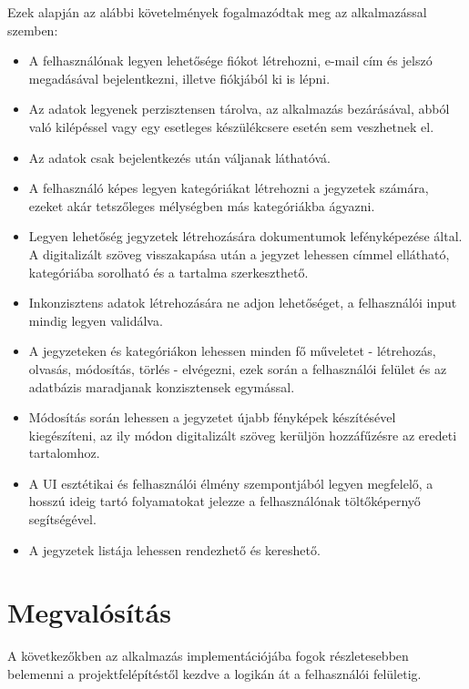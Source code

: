 Ezek alapján az alábbi követelmények fogalmazódtak meg az alkalmazással szemben:
\begin{itemize}
	\item A felhasználónak legyen lehetősége fiókot létrehozni, e-mail cím és jelszó megadásával bejelentkezni, illetve fiókjából ki is lépni.
	\item Az adatok legyenek perzisztensen tárolva, az alkalmazás bezárásával, abból való kilépéssel vagy egy esetleges készülékcsere esetén sem veszhetnek el.
	\item Az adatok csak bejelentkezés után váljanak láthatóvá.
	\item A felhasználó képes legyen kategóriákat létrehozni a jegyzetek számára, ezeket akár tetszőleges mélységben más kategóriákba ágyazni.
	\item Legyen lehetőség jegyzetek létrehozására dokumentumok lefényképezése által. A digitalizált szöveg visszakapása után a jegyzet lehessen címmel ellátható, kategóriába sorolható és a tartalma szerkeszthető.
	\item Inkonzisztens adatok létrehozására ne adjon lehetőséget, a felhasználói input mindig legyen validálva.
	\item A jegyzeteken és kategóriákon lehessen minden fő műveletet - létrehozás, olvasás, módosítás, törlés - elvégezni, ezek során a felhasználói felület és az adatbázis maradjanak konzisztensek egymással.
	\item Módosítás során lehessen a jegyzetet újabb fényképek készítésével kiegészíteni, az ily módon digitalizált szöveg kerüljön hozzáfűzésre az eredeti tartalomhoz.
	\item A UI esztétikai és felhasználói élmény szempontjából legyen megfelelő, a hosszú ideig tartó folyamatokat jelezze a felhasználónak töltőképernyő segítségével. 
	\item A jegyzetek listája lehessen rendezhető és kereshető. 
\end{itemize}

\section{Megvalósítás}

A következőkben az alkalmazás implementációjába fogok részletesebben belemenni a projektfelépítéstől kezdve a logikán át a felhasználói felületig.

